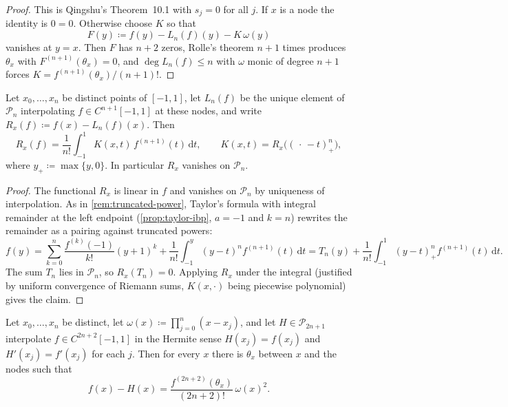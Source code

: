 \documentclass[11pt,a4paper]{article}
\begin{document}
\begin{proof}
This is Qingshu's Theorem~10.1 with \(s_{j}=0\) for all \(j\). If \(x\) is a node the identity is \(0=0\). Otherwise choose \(K\) so that
\[
F(y)
\coloneqq
f(y)-L_{n}(f)(y)-K\,\omega(y)
\]
vanishes at \(y=x\). Then \(F\) has \(n+2\) zeros, Rolle's theorem \(n+1\) times produces \(\theta_{x}\) with \(F^{(n+1)}(\theta_{x})=0\), and \(\deg L_{n}(f)\le n\) with \(\omega\) monic of degree \(n+1\) forces \(K=f^{(n+1)}(\theta_{x})/(n+1)!\).
\end{proof}

\begin{theorem}
\label{thm:peano-lagrange}
Let \(x_{0},\ldots,x_{n}\) be distinct points of \([-1,1]\), let \(L_{n}(f)\) be the unique element of \(\mathcal{P}_{n}\) interpolating \(f\in C^{n+1}[-1,1]\) at these nodes, and write \(R_{x}(f)\coloneqq f(x)-L_{n}(f)(x)\). Then
\[
R_{x}(f)
=
\frac{1}{n!}
\int_{-1}^{1} K(x,t)\,f^{(n+1)}(t)\,\mathrm{d}t,
\qquad
K(x,t)
=
R_{x}\bigl((\,\cdot\,-t)_{+}^{n}\bigr),
\]
where \(y_{+}\coloneqq\max\{y,0\}\). In particular \(R_{x}\) vanishes on \(\mathcal{P}_{n}\).
\end{theorem}

\begin{proof}
The functional \(R_{x}\) is linear in \(f\) and vanishes on \(\mathcal{P}_{n}\) by uniqueness of interpolation. As in \cref{rem:truncated-power}, Taylor's formula with integral remainder at the left endpoint (\cref{prop:taylor-ibp}, \(a=-1\) and \(k=n\)) rewrites the remainder as a pairing against truncated powers:
\[
f(y)
=
\sum_{k=0}^{n}\frac{f^{(k)}(-1)}{k!}(y+1)^{k}
+
\frac{1}{n!}
\int_{-1}^{y}(y-t)^{n}f^{(n+1)}(t)\,\mathrm{d}t
=
T_{n}(y)
+
\frac{1}{n!}
\int_{-1}^{1}(y-t)_{+}^{n}f^{(n+1)}(t)\,\mathrm{d}t.
\]
The sum \(T_{n}\) lies in \(\mathcal{P}_{n}\), so \(R_{x}(T_{n})=0\). Applying \(R_{x}\) under the integral (justified by uniform convergence of Riemann sums, \(K(x,\cdot)\) being piecewise polynomial) gives the claim.
\end{proof}

\begin{theorem}
\label{thm:hermite-double}
Let \(x_{0},\ldots,x_{n}\) be distinct, let \(\omega(x)\coloneqq\prod_{j=0}^{n}(x-x_{j})\), and let \(H\in\mathcal{P}_{2n+1}\) interpolate \(f\in C^{2n+2}[-1,1]\) in the Hermite sense \(H(x_{j})=f(x_{j})\) and \(H'(x_{j})=f'(x_{j})\) for each \(j\). Then for every \(x\) there is \(\theta_{x}\) between \(x\) and the nodes such that
\[
f(x)-H(x)
=
\frac{f^{(2n+2)}(\theta_{x})}{(2n+2)!}\,\omega(x)^{2}.
\]
\end{theorem}
\end{document}
